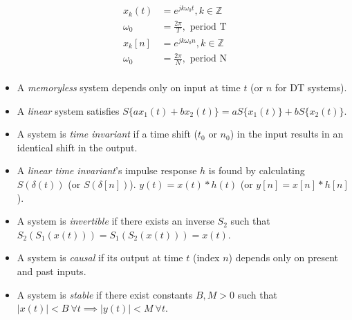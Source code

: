 \documentclass[8pt]{article}
\begin{document}
\begin{align*}
    x_k(t)   & = e^{jk\omega_0 t}, k \in \mathbb{Z} \\
    \omega_0 & = \frac{2\pi}{T}, \text{ period T}   \\
    x_k[n]   & = e^{jk\omega_0 n}, k \in \mathbb{Z} \\
    \omega_0 & = \frac{2\pi}{N}, \text{ period N}   \\
\end{align*}
\begin{itemize}
    \item A \emph{memoryless} system depends only on input at time
          \( t \) (or \( n \) for DT systems).
    \item A \emph{linear} system satisfies
          \(S\{a x_1(t) + b x_2(t)\} = a S\{x_1(t)\} + b S\{x_2(t)\}.\)
    \item A system is \emph{time invariant} if a time shift (\(t_0\) or \(n_0\)) in the input results in
          an identical shift in the output.
    \item A \emph{linear time invariant}'s impulse response \(h\) is found by calculating
          \(S(\delta(t))\) (or \(S(\delta[n])\)). \(y(t) = x(t) * h(t)\) (or \(y[n] = x[n] * h[n]\)).
    \item A system is \emph{invertible} if there exists
          an inverse \( S_2 \) such that
          \(S_2(S_1(x(t))) = S_1(S_2(x(t))) = x(t)\).
    \item A system is \emph{causal} if its output at time \( t \) (index \(n\)) depends
          only on present and past inputs.
    \item A system is \emph{stable} if there exist constants \( B, M > 0 \)
          such that
          \(|x(t)| < B \ \forall t \implies |y(t)| < M \ \forall t\).
\end{itemize}
\end{document}
